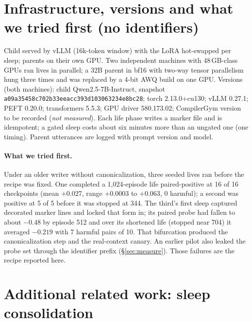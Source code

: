 \documentclass{article}
\newcommand{\nm}{\emph{not measured}}
\begin{document}
\section{Infrastructure, versions and what we tried first (no identifiers)}
\label{app:infra}

Child served by vLLM (16k-token window) with the LoRA hot-swapped per sleep; parents on their own GPU. Two independent machines with 48\,GB-class GPUs ran lives in parallel; a 32B parent in bf16 with two-way tensor parallelism hung three times and was replaced by a 4-bit AWQ build on one GPU. Versions (both machines): child Qwen2.5-7B-Instruct, snapshot \texttt{a09a35458c702b33eeacc393d103063234e8bc28}; torch 2.13.0+cu130; vLLM 0.27.1; PEFT 0.20.0; transformers 5.5.3; GPU driver 580.173.02; CompilerGym version to be recorded (\nm). Each life phase writes a marker file and is idempotent; a gated sleep costs about six minutes more than an ungated one (one timing). Parent utterances are logged with prompt version and model.

\paragraph{What we tried first.} Under an older writer without canonicalization, three seeded lives ran before the recipe was fixed. One completed a 1{,}024-episode life paired-positive at 16 of 16 checkpoints (mean $+0.027$, range $+0.0003$ to $+0.063$, 0 harmful); a second was positive at 5 of 5 before it was stopped at 344. The third's first sleep captured decorated marker lines and locked that form in; its paired probe had fallen to about $-0.48$ by episode 512 and over its shortened life (stopped near 704) it averaged $-0.219$ with 7 harmful pairs of 10. That bifurcation produced the canonicalization step and the real-context canary. An earlier pilot also leaked the probe set through the identifier prefix (\S\ref{sec:measure}). Those failures are the recipe reported here.

\section{Additional related work: sleep consolidation}
\label{app:related}
\end{document}
